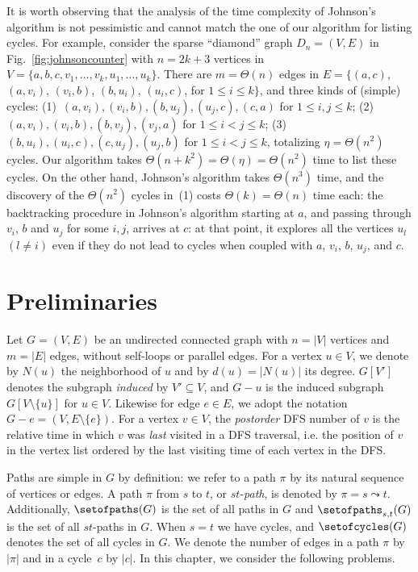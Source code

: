 It is worth observing that the analysis of the time complexity of Johnson's algorithm
is not pessimistic and cannot match the one of our algorithm for
listing cycles.  For example, consider the sparse ``diamond'' graph
$D_n = (V, E)$ in Fig.~\ref{fig:johnsoncounter} with $n=2k+3$
vertices in $V = \{a,b,c, v_1, \ldots, v_k, u_1, \ldots, u_k\}$. There
are $m = \Theta(n)$ edges in $E = \{ (a,c)$, $(a,v_i)$, $(v_i,b)$,
$(b,u_i)$, $(u_i,c)$, for $1 \leq i \leq k\}$, and three kinds of
(simple) cycles:
(1)~$(a, v_i), (v_i, b), (b, u_j), (u_j, c), (c, a)$ for $1 \leq i, j
\leq k$;
(2)~$(a, v_i), (v_i, b), (b, v_j), (v_j, a)$ for $1 \leq i < j \leq
k$;
(3)~$(b, u_i), (u_i, c), (c, u_j), (u_j, b)$ for $1 \leq i < j \leq
k$,
totalizing $\eta = \Theta(n^2)$ cycles.
Our algorithm takes $\Theta(n + k^2) = \Theta(\eta) = \Theta(n^2)$
time to list these cycles.  On the other hand, Johnson's algorithm
takes $\Theta(n^3)$ time, and the discovery of the $\Theta(n^2)$ cycles
in~(1) costs $\Theta(k) = \Theta(n)$ time each: the backtracking
procedure in Johnson's algorithm starting at $a$, and passing through
$v_i$, $b$ and $u_j$ for some $i,j$, arrives at $c$: at that point, it
explores all the vertices $u_l$ $(l \neq i)$ even if they do not lead
to cycles when coupled with $a$, $v_i$, $b$, $u_j$, and $c$.

\section{Preliminaries}

Let $G=(V,E)$ be an undirected connected graph with $n=|V|$ vertices
and $m=|E|$ edges, without self-loops or parallel edges. For a vertex
$u \in V$, we denote by $N(u)$ the neighborhood of $u$ and by
$d(u)=|N(u)|$ its degree.  $G[V']$ denotes the subgraph \emph{induced}
by $V' \subseteq V$, and $G - u$ is the induced subgraph $G[ V
\setminus \{u\}]$ for $u \in V$. Likewise for edge $e \in E$, we adopt
the notation $G-e = (V,E \setminus \{e\})$. For a vertex $v \in V$,
the \emph{postorder} DFS number of $v$ is the relative time in which
$v$ was \emph{last} visited in a DFS traversal, i.e. the position of
$v$ in the vertex list ordered by the last visiting time of each
vertex in the DFS.

Paths are simple in $G$ by definition: we refer to a path $\pi$ by its
natural sequence of vertices or edges.  A path $\pi$ from $s$ to $t$,
or $st$-\emph{path}, is denoted by $\pi = s \leadsto t$. Additionally,
$\setofpaths(G)$ is the set of all paths in $G$ and
$\setofpaths_{s,t}(G)$ is the set of all $st$-paths in $G$.  When
$s=t$ we have cycles, and $\setofcycles(G)$ denotes the set of all
cycles in $G$. We denote the number of edges in a path $\pi$ by
$|\pi|$ and in a cycle~$c$ by $|c|$. In this chapter, we consider the following
problems.

